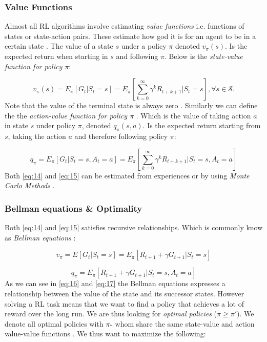 \documentclass{kththesis}
\theoremstyle{definition}
\begin{document}
\subsubsection*{Value Functions}

Almost all RL algorithms involve estimating \textit{value functions} i.e. functions of states or state-action pairs. These estimate how god it is for an agent to be in a certain state \parencite{sutton1998reinforcement, li2017deep}. The value of a state $s$ under a policy $\pi$ denoted $v_{\pi}(s)$. Is the expected return when starting in $s$ and following $\pi$. Below is the \textit{state-value function for policy $\pi$}:

\begin{equation}
    \label{eq:14}
    v_{\pi}(s) = E_{\pi}[G_t | S_t = s] = E_{\pi}\left[\sum_{k=0}^{\infty}{\gamma^{k}R_{t+k+1}} | S_t = s\right], \forall s \in \mathcal{S}.
\end{equation}
Note that the value of the terminal state is always zero \parencite{sutton1998reinforcement}. Similarly  we can define the the \textit{action-value function for policy $\pi$} \parencite{sutton1998reinforcement}. Which is the value of taking action $a$ in state $s$ under policy $\pi$, denoted $q_{\pi}(s,a)$. Is the expected return starting from $s$, taking the action $a$ and therefore following policy $\pi$:

\begin{equation}
    \label{eq:15}
    q_{\pi} = E_{\pi}[G_t | S_t =s, A_t = a] = E_{\pi} \left[\sum_{k=0}^{\infty}{\gamma^{k}R_{t+k+1}} | S_t=s, A_t=a \right]
\end{equation}
Both \autoref{eq:14} and \autoref{eq:15} can be estimated from experiences or by using \textit{Monte Carlo Methods} \parencite{sutton1998reinforcement}.

\subsubsection*{Bellman equations \& Optimality}
Both \autoref{eq:14} and \autoref{eq:15} satisfies recursive relationships. Which is commonly know as \textit{Bellman equations} \parencite{sutton1998reinforcement}:

\begin{equation}
    \label{eq:16}
    v_{\pi} = E[G_t | S_t = s] = E_{\pi}[R_{t+1} + \gamma G_{t+1} | S_t = s]
\end{equation}

\begin{equation}
    \label{eq:17}
    q_{\pi} = E_{\pi}[R_{t+1} + \gamma G_{t+1} | S_t = s,  A_t = a]
\end{equation}
As we can see in \autoref{eq:16} and \autoref{eq:17} the Bellman equations expresses a relationship between the value of the state and its successor states. However solving a RL task means that we want to find a policy that achieves a lot of reward over the long run. We are thus looking for \textit{optimal policies} ($\pi \geq \pi'$). We denote all optimal policies with $\pi_{*}$ whom share the same state-value and action value-value functions \parencite{sutton1998reinforcement}. We thus want to maximize the following:
\end{document}

